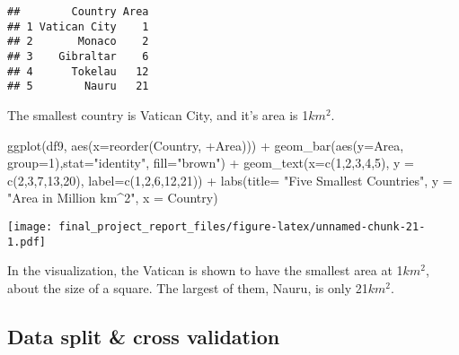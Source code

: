 \documentclass[
]{article}
\newenvironment{Shaded}{\begin{snugshade}}{\end{snugshade}}
\newcommand{\AttributeTok}[1]{\textcolor[rgb]{0.77,0.63,0.00}{#1}}
\newcommand{\DecValTok}[1]{\textcolor[rgb]{0.00,0.00,0.81}{#1}}
\newcommand{\FunctionTok}[1]{\textcolor[rgb]{0.00,0.00,0.00}{#1}}
\newcommand{\NormalTok}[1]{#1}
\newcommand{\SpecialCharTok}[1]{\textcolor[rgb]{0.00,0.00,0.00}{#1}}
\newcommand{\StringTok}[1]{\textcolor[rgb]{0.31,0.60,0.02}{#1}}
\begin{document}
\begin{verbatim}
##        Country Area
## 1 Vatican City    1
## 2       Monaco    2
## 3    Gibraltar    6
## 4      Tokelau   12
## 5        Nauru   21
\end{verbatim}

The smallest country is Vatican City, and it's area is 1\(km^2\).

\begin{Shaded}
\begin{Highlighting}[]
\FunctionTok{ggplot}\NormalTok{(df9, }\FunctionTok{aes}\NormalTok{(}\AttributeTok{x=}\FunctionTok{reorder}\NormalTok{(Country, }\SpecialCharTok{+}\NormalTok{Area)))  }\SpecialCharTok{+} 
  \FunctionTok{geom\_bar}\NormalTok{(}\FunctionTok{aes}\NormalTok{(}\AttributeTok{y=}\NormalTok{Area, }\AttributeTok{group=}\DecValTok{1}\NormalTok{),}\AttributeTok{stat=}\StringTok{"identity"}\NormalTok{, }\AttributeTok{fill=}\StringTok{"brown"}\NormalTok{) }\SpecialCharTok{+}
  \FunctionTok{geom\_text}\NormalTok{(}\AttributeTok{x=}\FunctionTok{c}\NormalTok{(}\DecValTok{1}\NormalTok{,}\DecValTok{2}\NormalTok{,}\DecValTok{3}\NormalTok{,}\DecValTok{4}\NormalTok{,}\DecValTok{5}\NormalTok{), }\AttributeTok{y =} \FunctionTok{c}\NormalTok{(}\DecValTok{2}\NormalTok{,}\DecValTok{3}\NormalTok{,}\DecValTok{7}\NormalTok{,}\DecValTok{13}\NormalTok{,}\DecValTok{20}\NormalTok{), }\AttributeTok{label=}\FunctionTok{c}\NormalTok{(}\DecValTok{1}\NormalTok{,}\DecValTok{2}\NormalTok{,}\DecValTok{6}\NormalTok{,}\DecValTok{12}\NormalTok{,}\DecValTok{21}\NormalTok{)) }\SpecialCharTok{+}
  \FunctionTok{labs}\NormalTok{(}\AttributeTok{title=} \StringTok{"Five Smallest Countries"}\NormalTok{, }\AttributeTok{y =} \StringTok{"Area in Million km\^{}2"}\NormalTok{, }
        \AttributeTok{x =} \StringTok{\textquotesingle{}Country\textquotesingle{}}\NormalTok{)}
\end{Highlighting}
\end{Shaded}

\texttt{[image: final\_project\_report\_files/figure-latex/unnamed-chunk-21-1.pdf]}

In the visualization, the Vatican is shown to have the smallest area at
1\(km^2\), about the size of a square. The largest of them, Nauru, is
only 21\(km^2\).

\hypertarget{data-split-cross-validation}{%
\subsection{Data split \& cross
validation}\label{data-split-cross-validation}}
\end{document}
